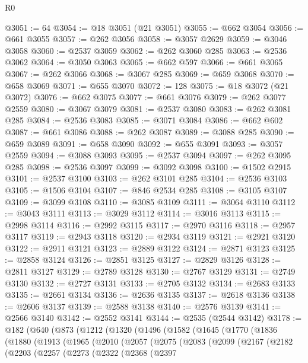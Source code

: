 \begin{lexlean}{R0}
\begin{coremodule}
@3051 := 64
@3054 := @18 @3051 (@21 @3051)
@3055 := @662 @3054
@3056 := @661 @3055
@3057 := @262 @3056
@3058 := @3057 @2629
@3059 := @3046 @3058
@3060 := @2537 @3059
@3062 := @262 @3060 @285
@3063 := @2536 @3062
@3064 := @3050 @3063
@3065 := @662 @597
@3066 := @661 @3065
@3067 := @262 @3066
@3068 := @3067 @285
@3069 := @659 @3068
@3070 := @658 @3069
@3071 := @655 @3070
@3072 := 128
@3075 := @18 @3072 (@21 @3072)
@3076 := @662 @3075
@3077 := @661 @3076
@3079 := @262 @3077 @2559
@3080 := @3067 @3079
@3081 := @2537 @3080
@3083 := @262 @3081 @285
@3084 := @2536 @3083
@3085 := @3071 @3084
@3086 := @662 @602
@3087 := @661 @3086
@3088 := @262 @3087
@3089 := @3088 @285
@3090 := @659 @3089
@3091 := @658 @3090
@3092 := @655 @3091
@3093 := @3057 @2559
@3094 := @3088 @3093
@3095 := @2537 @3094
@3097 := @262 @3095 @285
@3098 := @2536 @3097
@3099 := @3092 @3098
@3100 := @1502 @2915
@3101 := @2537 @3100
@3103 := @262 @3101 @285
@3104 := @2536 @3103
@3105 := @1506 @3104
@3107 := @846 @2534 @285
@3108 := @3105 @3107
@3109 := @3099 @3108
@3110 := @3085 @3109
@3111 := @3064 @3110
@3112 := @3043 @3111
@3113 := @3029 @3112
@3114 := @3016 @3113
@3115 := @2998 @3114
@3116 := @2992 @3115
@3117 := @2970 @3116
@3118 := @2957 @3117
@3119 := @2943 @3118
@3120 := @2934 @3119
@3121 := @2921 @3120
@3122 := @2911 @3121
@3123 := @2889 @3122
@3124 := @2871 @3123
@3125 := @2858 @3124
@3126 := @2851 @3125
@3127 := @2829 @3126
@3128 := @2811 @3127
@3129 := @2789 @3128
@3130 := @2767 @3129
@3131 := @2749 @3130
@3132 := @2727 @3131
@3133 := @2705 @3132
@3134 := @2683 @3133
@3135 := @2661 @3134
@3136 := @2636 @3135
@3137 := @2618 @3136
@3138 := @2606 @3137
@3139 := @2588 @3138
@3140 := @2576 @3139
@3141 := @2566 @3140
@3142 := @2552 @3141
@3144 := @2535 (@2544 @3142)
@3178 := @182
    (@640
      (@873
        (@1212
          (@1320
            (@1496
              (@1582
                (@1645
                  (@1770
                    (@1836
                      (@1880
                        (@1913
                          (@1965
                            (@2010
                              (@2057
                                (@2075
                                  (@2083
                                    (@2099
                                      (@2167
                                        (@2182
                                          (@2203
                                            (@2257
                                              (@2273
                                                (@2322
                                                  (@2368
                                                    (@2397

\end{coremodule}
\end{lexlean}
